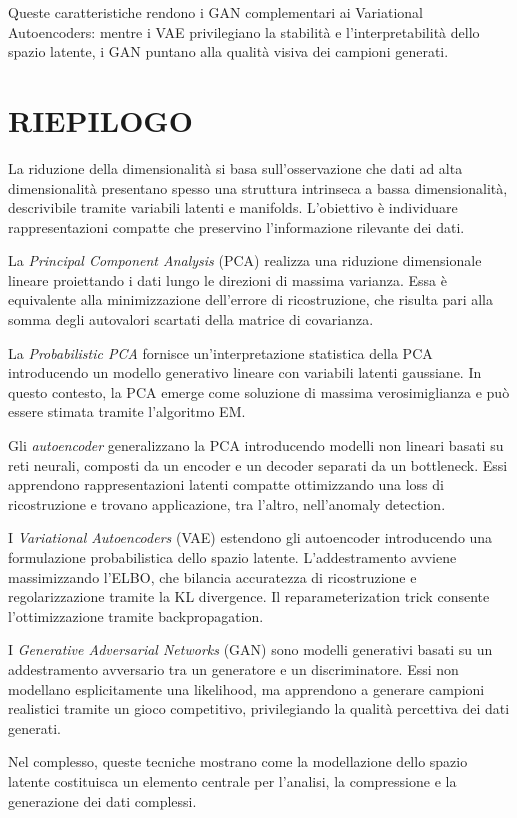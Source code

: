 \documentclass[a4paper,12pt]{report}
\begin{document}
Queste caratteristiche rendono i GAN complementari ai Variational Autoencoders: mentre i VAE privilegiano la stabilità e l’interpretabilità dello spazio latente, i GAN puntano alla qualità visiva dei campioni generati.

\newpage
\section*{RIEPILOGO}

\begin{tcolorbox}[
    colback=green!5,
    colframe=green!50!black,
    title=Convolutional Neural Networks,
    breakable
]

La riduzione della dimensionalità si basa sull’osservazione che dati ad alta dimensionalità presentano spesso una struttura intrinseca a bassa dimensionalità, descrivibile tramite variabili latenti e manifolds. L’obiettivo è individuare rappresentazioni compatte che preservino l’informazione rilevante dei dati.

La \emph{Principal Component Analysis} (PCA) realizza una riduzione dimensionale lineare proiettando i dati lungo le direzioni di massima varianza. Essa è equivalente alla minimizzazione dell’errore di ricostruzione, che risulta pari alla somma degli autovalori scartati della matrice di covarianza.

La \emph{Probabilistic PCA} fornisce un’interpretazione statistica della PCA introducendo un modello generativo lineare con variabili latenti gaussiane. In questo contesto, la PCA emerge come soluzione di massima verosimiglianza e può essere stimata tramite l’algoritmo EM.

Gli \emph{autoencoder} generalizzano la PCA introducendo modelli non lineari basati su reti neurali, composti da un encoder e un decoder separati da un bottleneck. Essi apprendono rappresentazioni latenti compatte ottimizzando una loss di ricostruzione e trovano applicazione, tra l’altro, nell’anomaly detection.

I \emph{Variational Autoencoders} (VAE) estendono gli autoencoder introducendo una formulazione probabilistica dello spazio latente. L’addestramento avviene massimizzando l’ELBO, che bilancia accuratezza di ricostruzione e regolarizzazione tramite la KL divergence. Il reparameterization trick consente l’ottimizzazione tramite backpropagation.

I \emph{Generative Adversarial Networks} (GAN) sono modelli generativi basati su un addestramento avversario tra un generatore e un discriminatore. Essi non modellano esplicitamente una likelihood, ma apprendono a generare campioni realistici tramite un gioco competitivo, privilegiando la qualità percettiva dei dati generati.

Nel complesso, queste tecniche mostrano come la modellazione dello spazio latente costituisca un elemento centrale per l’analisi, la compressione e la generazione dei dati complessi.

\end{tcolorbox}
\end{document}
